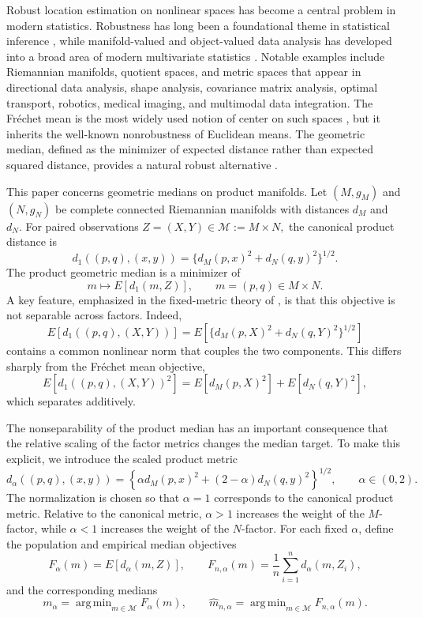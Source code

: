 \documentclass[11pt]{article}
\newcommand{\Frechet}{Fr\'{e}chet\xspace}
\DeclareMathOperator*{\argmin}{arg\,min}
\newcommand{\M}{\mathcal M}
\newcommand{\1}{\mathbf{1}}
\begin{document}
Robust location estimation on nonlinear spaces has become a central problem in
modern statistics.  Robustness has long been a foundational theme in statistical
inference \citep{huber_1981_RobustStatistics, hampel_2005_RobustStatisticsApproach}, while manifold-valued and object-valued data
analysis has developed into a broad area of modern multivariate statistics \citep{bhattacharya_2012_NonparametricInferenceManifolds, patrangenaru_2016_NonparametricStatisticsManifolds, pennec_2020_RiemannianGeometricStatistics}.  Notable examples include
Riemannian manifolds, quotient spaces, and metric spaces that appear in
directional data analysis, shape analysis, covariance matrix analysis, optimal
transport, robotics, medical imaging, and multimodal data integration.  The
\Frechet mean is the most widely used notion of center on such spaces \citep{frechet_1948_ElementsAleatoiresNature, bhattacharya_2003_LargeSampleTheory}, but it inherits the
well-known nonrobustness of Euclidean means.  The geometric median, defined as
the minimizer of expected distance rather than expected squared distance,
provides a natural robust alternative \citep{vardi_2000_MultivariateL1medianAssociated, minsker_2015_GeometricMedianRobust, fletcher_2009_GeometricMedianRiemannian, you_2025_WassersteinMedianProbability}.




This paper concerns geometric medians on product manifolds.  Let $(M,g_M)$ and $(N,g_N)$ be complete connected Riemannian manifolds with distances $d_M$ and $d_N$.  For paired observations
$
 Z=(X,Y)\in \M:=M\times N,
$
the canonical product distance is
\[
 d_1((p,q),(x,y))=\bigl\{d_M(p,x)^2+d_N(q,y)^2\bigr\}^{1/2}.
\]
The product geometric median is a minimizer of
\[
 m\mapsto E[d_1(m,Z)],\qquad m=(p,q)\in M\times N.
\]
A key feature, emphasized in the fixed-metric theory of \citet{park_2026_GeometricMediansProduct}, is that this objective is not separable across factors.  Indeed,
\[
 E[d_1((p,q),(X,Y))]
 =E\left[\{d_M(p,X)^2+d_N(q,Y)^2\}^{1/2}\right]
\]
contains a common nonlinear norm that couples the two components. This differs sharply from the Fr\'echet mean objective,
\[
 E[d_1((p,q),(X,Y))^2]
 =E[d_M(p,X)^2]+E[d_N(q,Y)^2],
\]
which separates additively.

The nonseparability of the product median has an important consequence that the relative scaling of the factor metrics changes the median target.  To make this explicit, we introduce the scaled product metric
\begin{equation}\label{eq:scaled-distance-intro}
 d_\alpha((p,q),(x,y))
 =\left\{\alpha d_M(p,x)^2+(2-\alpha)d_N(q,y)^2\right\}^{1/2},
 \qquad \alpha\in(0,2).
\end{equation}
The normalization is chosen so that $\alpha=1$ corresponds to the canonical product metric.  Relative to the canonical metric, $\alpha>1$ increases the weight of the
$M$-factor, while $\alpha<1$ increases the weight of the $N$-factor. For each fixed $\alpha$, define the population and empirical median objectives
\[
 F_\alpha(m)=E[d_\alpha(m,Z)],
 \qquad
 F_{n,\alpha}(m)=\frac1n\sum_{i=1}^n d_\alpha(m,Z_i),
\]
and the corresponding medians
\[
 m_\alpha=\argmin_{m\in\M}F_\alpha(m),
 \qquad
 \widehat m_{n,\alpha}=\argmin_{m\in\M}F_{n,\alpha}(m).
\]
\end{document}
